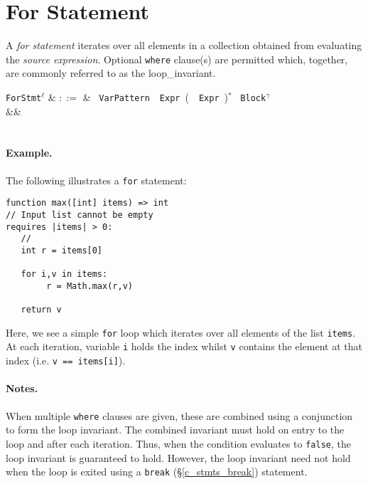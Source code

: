 \section{For Statement}
\label{c_stmts_for}
A {\em for statement} iterates over all elements in a collection obtained from evaluating the {\em source expression}.  Optional \lstinline{where} clause(s) are permitted which, together, are commonly referred to as the \gls{loop_invariant}.  

\begin{syntax}
  \verb+ForStmt+$^\ell$ & $::=$ & \ \verb+VarPattern+\
  \ \verb+Expr+\ \big(\ \ \verb+Expr+\
  \big)$^*$\ \token{:} \verb+Block+$^\gamma$\\
&&\\
\\
\end{syntax}

\paragraph{Example.} The following illustrates a \lstinline{for} statement:

\begin{lstlisting}
function max([int] items) => int
// Input list cannot be empty
requires |items| > 0:
   //
   int r = items[0]
   
   for i,v in items:
        r = Math.max(r,v)
   
   return v
\end{lstlisting}
Here, we see a simple \lstinline{for} loop which iterates over all elements of the list \lstinline{items}.  At each iteration, variable \lstinline{i} holds the index whilst \lstinline{v} contains the element at that index (i.e. \lstinline{v == items[i]}).

\paragraph{Notes.}   When multiple \lstinline{where} clauses are given, these are combined using a conjunction to form the loop invariant.  The combined invariant must hold on entry to the loop and after each iteration.  Thus, when the condition evaluates to \lstinline{false}, the loop invariant is guaranteed to hold.  However, the loop invariant need not hold when the loop is exited using a \lstinline{break} (\S\ref{c_stmts_break}) statement.


